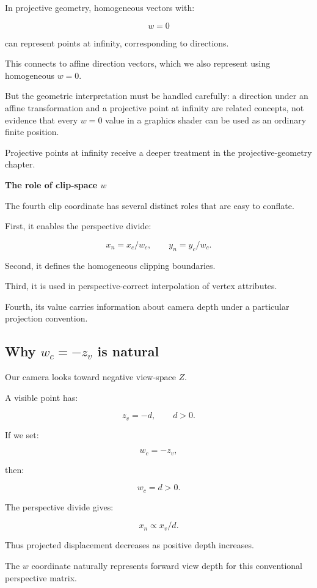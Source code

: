 In projective geometry, homogeneous vectors with:

\[
 w=0
\]

can represent points at infinity, corresponding to directions.

This connects to affine direction vectors, which we also represent using homogeneous \(w=0\).

But the geometric interpretation must be handled carefully: a direction under an affine transformation and a projective point at infinity are related concepts, not evidence that every \(w=0\) value in a graphics shader can be used as an ordinary finite position.

Projective points at infinity receive a deeper treatment in the projective-geometry chapter.

\textbf{The role of clip-space \(w\)}

The fourth clip coordinate has several distinct roles that are easy to conflate.

First, it enables the perspective divide:

\[
 x_n=x_c/w_c, \qquad y_n=y_c/w_c.
\]

Second, it defines the homogeneous clipping boundaries.

Third, it is used in perspective-correct interpolation of vertex attributes.

Fourth, its value carries information about camera depth under a particular projection convention.

\subsection{\texorpdfstring{Why \(w_c=-z_v\) is natural}{Why w\_c=-z\_v is natural}}\label{02-foundations-ii-ch033-why-w_c-z_v-is-natural}

Our camera looks toward negative view-space \(Z\).

A visible point has:

\[
 z_v=-d, \qquad d>0.
\]

If we set:

\[
 w_c=-z_v,
\]

then:

\[
 w_c=d>0.
\]

The perspective divide gives:

\[
 x_n\propto x_v/d.
\]

Thus projected displacement decreases as positive depth increases.

The \(w\) coordinate naturally represents forward view depth for this conventional perspective matrix.

